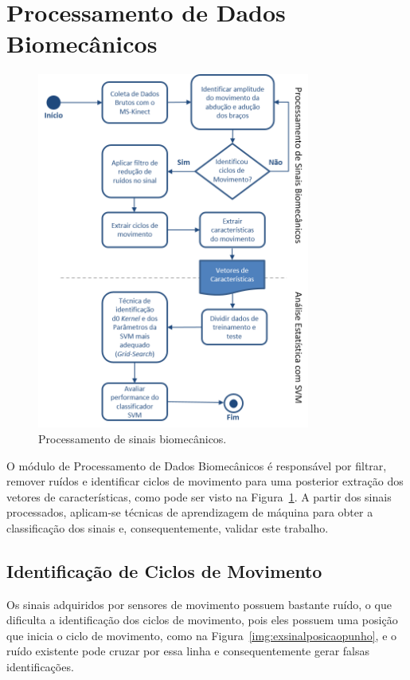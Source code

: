 \section{Processamento de Dados Biomecânicos}\label{sec:processador_bio}
\begin{figure}[!htb]
     \centering
     \includegraphics[width=0.8\textwidth]{./img/biomecprocessor2.png}
     \caption{Processamento de sinais biomecânicos.}
     \label{img:process_bio}
\end{figure}
O módulo de Processamento de Dados Biomecânicos é responsável por filtrar, remover ruídos e identificar ciclos de movimento para uma posterior extração dos vetores de características, como pode ser visto na Figura~\ref{img:process_bio}. A partir dos sinais processados, aplicam-se técnicas de aprendizagem de máquina para obter a classificação dos sinais e, consequentemente, validar este trabalho.




\subsection{Identificação de Ciclos de Movimento}\label{section:identificao_ciclos}

Os sinais adquiridos por sensores de movimento possuem bastante ruído, o que dificulta a identificação dos ciclos de movimento, pois eles possuem uma posição que inicia o ciclo de movimento, como na Figura~\ref{img:exsinalposicaopunho}, e o ruído existente pode cruzar por essa linha e consequentemente gerar falsas identificações. 

